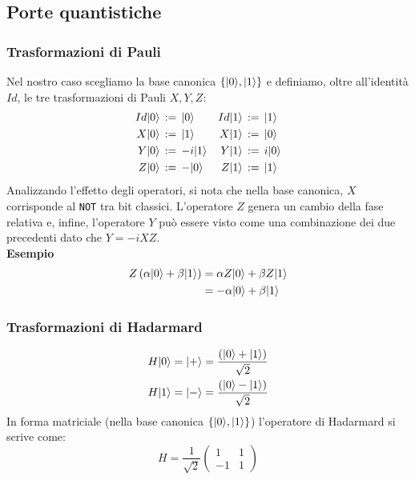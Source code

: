 \documentclass[12pt, a4paper]{report}
\begin{document}
\subsection{Porte quantistiche}
\subsubsection{Trasformazioni di Pauli}
Nel nostro caso scegliamo la base canonica $\left\{| 0 \rangle,| 1 \rangle\right\}$ e definiamo, oltre all'identità $Id$, le tre trasformazioni di Pauli $X,Y,Z$:
\begin{equation*}
    \begin{alignedat}{2}
        Id| 0 \rangle &\,:=\, | 0 \rangle \quad & Id| 1 \rangle &\,:=\, | 1 \rangle \\
        X| 0 \rangle  &\,:=\, | 1 \rangle \quad & X| 1 \rangle  &\,:=\, | 0 \rangle \\
        Y| 0 \rangle  &\,:=\,-i| 1 \rangle \quad & Y| 1 \rangle &\,:=\, i| 0 \rangle \\
        Z| 0 \rangle  &\,:=\,-| 0 \rangle \quad & Z| 1 \rangle &\,:=\, | 1 \rangle
    \end{alignedat}
\end{equation*}
Analizzando l'effetto degli operatori, si nota che nella base canonica, $X$ corrisponde al \texttt{NOT} tra bit classici. L'operatore $Z$ genera un cambio della fase relativa e, infine, l'operatore $Y$ può essere visto come una combinazione dei due precedenti dato che $Y=-iXZ$.\\
\textbf{Esempio}
\begin{equation*}
    \begin{split}
        Z\left(\alpha| 0 \rangle+\beta| 1 \rangle\right) &= \alpha Z| 0 \rangle+\beta Z| 1 \rangle \\
        &= -\alpha| 0 \rangle+\beta| 1 \rangle
    \end{split}
\end{equation*}
\subsubsection{Trasformazioni di Hadarmard}
\begin{equation*}
    \begin{split}
        H| 0 \rangle &= | + \rangle = \frac{(| 0 \rangle+| 1 \rangle)}{\sqrt{2}} \\
        H| 1 \rangle &= | - \rangle = \frac{(| 0 \rangle-| 1 \rangle)}{\sqrt{2}}
    \end{split}
\end{equation*}
In forma matriciale (nella base canonica $\left\{| 0 \rangle,| 1 \rangle\right\}$) l'operatore di Hadarmard si scrive come:
\begin{equation*}
    H = \frac{1}{\sqrt{2}}
    \begin{pmatrix}
        1 & 1 \\
        -1 & 1
    \end{pmatrix}
\end{equation*}
\end{document}
